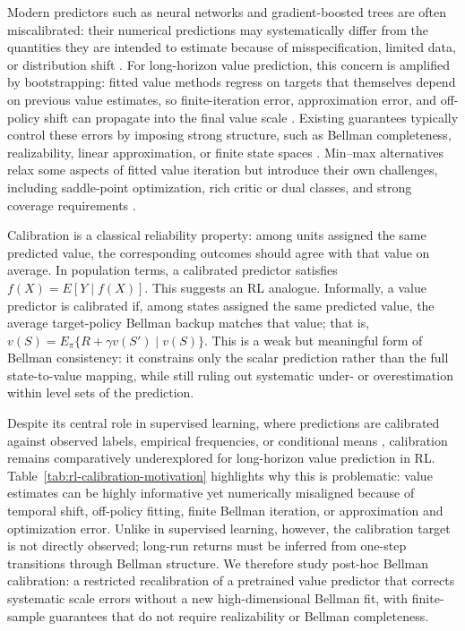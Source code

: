 \documentclass{article}
\theoremstyle{plain}
\theoremstyle{definition}
\theoremstyle{remark}
\begin{document}
Modern predictors such as neural networks and gradient-boosted trees are often
miscalibrated: their numerical predictions may systematically differ from the
quantities they are intended to estimate because of misspecification, limited
data, or distribution shift
\citep{zadrozny2001obtaining,niculescu2005predicting,bella2010calibration,guo2017calibration}.
For long-horizon value prediction, this concern is amplified by bootstrapping:
fitted value methods regress on targets that themselves depend on previous
value estimates, so finite-iteration error, approximation error, and off-policy
shift can propagate into the final value scale
\citep{gordon1995stable,tsitsiklis1996analysis,munos2008finite,
farahmand2010error,agarwal2021deep}. Existing guarantees typically control
these errors by imposing strong structure, such as Bellman completeness,
realizability, linear approximation, or finite state spaces
\citep{chen2019information,xie2022role,meyn2024projected,xie2021batch}. Min--max
alternatives relax some aspects of fitted value iteration but introduce their
own challenges, including saddle-point optimization, rich critic or dual
classes, and strong coverage requirements
\citep{dai2018sbeed,uehara2020minimax,jin2021bellman,xie2021batch}.

Calibration is a classical reliability property: among units assigned the same
predicted value, the corresponding outcomes should agree with that value on
average. In population terms, a calibrated predictor satisfies
\(f(X) = E[Y \mid f(X)]\). This suggests an RL analogue. Informally, a value
predictor is calibrated if, among states assigned the same predicted value, the
average target-policy Bellman backup matches that value; that is,
\(v(S) = E_\pi\{R + \gamma v(S') \mid v(S)\}\). This is a weak but meaningful
form of Bellman consistency: it constrains only the scalar prediction rather
than the full state-to-value mapping, while still ruling out systematic under-
or overestimation within level sets of the prediction.

Despite its central role in supervised learning, where predictions are
calibrated against observed labels, empirical frequencies, or conditional means
\citep{lichtenstein1977calibration,platt1999probabilistic,zadrozny2001obtaining,
vovk2005algorithmic,gupta2020distribution,gupta2021distribution,
whitehouse2024orthogonal}, calibration remains comparatively underexplored for
long-horizon value prediction in RL. Table~\ref{tab:rl-calibration-motivation}
highlights why this is problematic: value estimates can be highly informative
yet numerically misaligned because of temporal shift, off-policy fitting, finite
Bellman iteration, or approximation and optimization error. Unlike in supervised
learning, however, the calibration target is not directly observed; long-run
returns must be inferred from one-step transitions through Bellman structure.
We therefore study post-hoc Bellman calibration: a restricted recalibration of a
pretrained value predictor that corrects systematic scale errors without a new
high-dimensional Bellman fit, with finite-sample guarantees that do not require
realizability or Bellman completeness.
\end{document}
